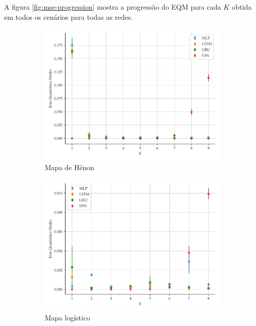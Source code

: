 \documentclass{article}
\begin{document}
A figura \ref{fig:mse-progression} mostra a progressão do EQM para cada $K$ obtida em todos os cenários para todas as redes. 
\begin{figure}[H]
     \begin{subfigure}[t]{0.2\textwidth}
         \includegraphics[scale=0.2]{progressao-k-henon.pdf}
         \caption{Mapa de Hénon}
     \end{subfigure}
     \centering
     \begin{subfigure}[t]{0.2\textwidth} 
         \includegraphics[scale=0.2]{progressao-k-logistic.pdf}
         \caption{Mapa logístico}
     \end{subfigure}
     \centering
     \begin{subfigure}[t]{0.2\textwidth}

\end{subfigure}
\end{figure}
\end{document}
